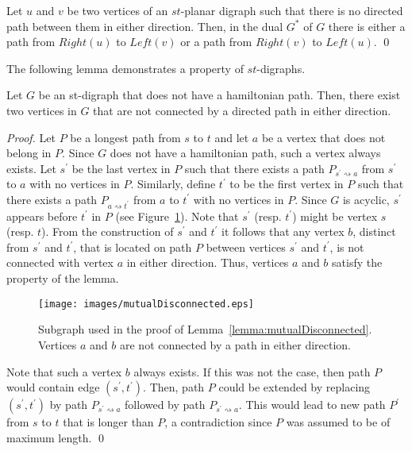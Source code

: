 \documentclass{myllncs-mixalis}
\begin{document}
\begin{lemma}
\label{lem:TamassiaPreparata} Let $u$ and $v$ be two vertices of an
$st$-planar digraph such that there is no directed path between them
in either direction. Then, in the dual $G^*$ of $G$ there is either
a path from $Right(u)$ to $Left(v)$ or a path from $Right(v)$ to
$Left(u)$. \qed
\end{lemma}

The following lemma demonstrates a property of $st$-digraphs.

\begin{lemma}
\label{lemma:mutualDisconnected} Let $G$ be an st-digraph that does
not have a hamiltonian path. Then, there exist two vertices in $G$
that are not connected by a directed path in either direction.
\end{lemma}

\begin{proof}

Let $P$ be a  longest path from $s$ to $t$ and let $a$ be a vertex
that does not belong in $P$. Since $G$ does not have a hamiltonian
path, such a vertex always exists.  Let $s^\prime$ be the last
vertex in $P$ such that there exists a path
$P_{s^\prime\rightsquigarrow a}$  from $s^\prime$ to $a$ with no
vertices in $P$. Similarly, define $t^\prime$ to be the first vertex
in $P$ such that there exists a path $P_{ a\rightsquigarrow
t^\prime}$ from $a$ to $t^\prime$ with no vertices in $P$. Since $G$
is acyclic, $s^\prime$ appears before $t^\prime$ in $P$ (see
Figure~\ref{fig:mutualDisconnected}). Note that $s^\prime$ (resp.
$t^\prime$) might be vertex $s$ (resp. $t$). From the construction
of $s^\prime$ and $t^\prime$ it follows that any vertex $b$,
distinct from $s^\prime$ and $t^\prime$, that is located on path $P$
between vertices  $s^\prime$ and $t^\prime$, is not connected with
vertex $a$ in either direction. Thus, vertices $a$ and $b$ satisfy
the property of the lemma.




\begin{figure}[htb]
    \centering
    \texttt{[image: images/mutualDisconnected.eps]}
    \caption{Subgraph used in the proof of
    Lemma~\ref{lemma:mutualDisconnected}. Vertices $a$ and $b$ are
    not connected by a path in either direction.}
    \label{fig:mutualDisconnected}
\end{figure}

Note that such a vertex $b$ always exists. If this was not the case,
then  path $P$ would contain edge $(s^\prime,t^\prime)$.  Then, path
$P$ could be extended by replacing  $(s^\prime, t^\prime)$ by path
$P_{s^\prime\rightsquigarrow a}$ followed by path
$P_{s^\prime\rightsquigarrow a}$. This would lead to new path
$P^\prime$ from $s$ to $t$ that is longer than $P$, a contradiction
since $P$ was assumed to be of maximum length. \qed
\end{proof}
\end{document}
